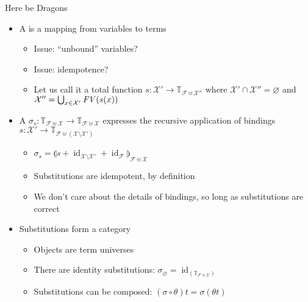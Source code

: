 \documentclass[pdf,fyma2]{prosper} %
\renewcommand{\emptyset}{\varnothing}
\newcommand{\opr}[1]{\ensuremath{\operatorname{#1}}}
\newcommand{\var}[1]{\ensuremath{\text{\textrm{\textit{#1}}}}}
\newcommand{\TERMS}[2][]{\ensuremath{\mathbb{T}_{#2}^{#1}}}
\newcommand{\FREEVARS}{\ensuremath{\var{FV}}}
\begin{document}
\begin{slide}{Here be Dragons}
	\begin{itemize}
    \item A  is a mapping from variables to terms
        \begin{itemize}
        \item Issue: ``unbound'' variables?
        \item Issue: idempotence?
        \item Let us call it a total function $s : \mathcal{X'} \to \TERMS{\mathcal{F}\uplus\mathcal{X''}}$ where $\mathcal{X'}\cap\mathcal{X''}=\emptyset$ and $\mathcal{X''} = \bigcup_{x\in \mathcal{X'}} \FREEVARS(s(x))$
        \end{itemize}
    \item A  $\sigma_s : \TERMS{\mathcal{F}\uplus\mathcal{X}} \to \TERMS{\mathcal{F}\uplus\mathcal{X}}$ expresses the recursive application of bindings $s : \mathcal{X'} \to \TERMS{\mathcal{F}\uplus(\mathcal{X}\setminus\mathcal{X'})}$
        \begin{itemize}
        \item $\sigma_s = {\llparenthesis s + \opr{id}_{\mathcal{X}\setminus\mathcal{X'}} + \opr{id}_\mathcal{F} \rrparenthesis}_{\mathcal{F}\uplus\mathcal{X}}$
        \item Substitutions are idempotent, by definition
        \item We don't care about the details of bindings, so long as substitutions are correct
        \end{itemize}
    \item Substitutions form a category
        \begin{itemize}
        \item Objects are term universes
        \item There are identity substitutions: $\sigma_\emptyset = \opr{id}_{(\TERMS{\mathcal{F}\uplus\mathcal{X}})}$
        \item Substitutions can be composed: $(\sigma \circ \theta) t = \sigma (\theta t)$
        \end{itemize}
	\end{itemize}
\end{slide}
\end{document}
